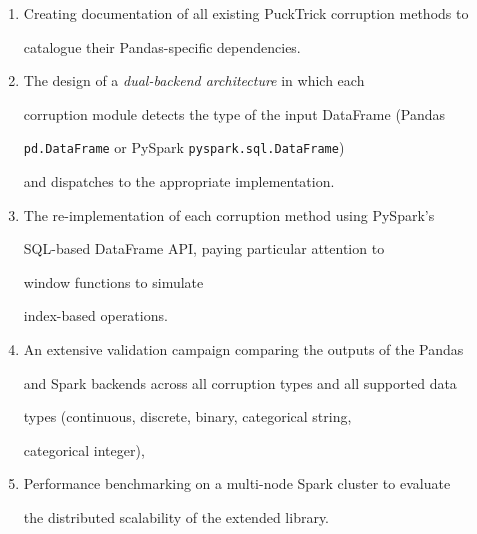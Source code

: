 \begin{enumerate}

    \item Creating documentation of all existing PuckTrick corruption methods to

          catalogue their Pandas-specific dependencies.

    \item The design of a \emph{dual-backend architecture} in which each

          corruption module detects the type of the input DataFrame (Pandas

          \texttt{pd.DataFrame} or PySpark \texttt{pyspark.sql.DataFrame})

          and dispatches to the appropriate implementation.

    \item The re-implementation of each corruption method using PySpark's

          SQL-based DataFrame API, paying particular attention to

          window functions to simulate

          index-based operations.

    \item An extensive validation campaign comparing the outputs of the Pandas

          and Spark backends across all corruption types and all supported data

          types (continuous, discrete, binary, categorical string,

          categorical integer),

    \item Performance benchmarking on a multi-node Spark cluster to evaluate

          the distributed scalability of the extended library.

\end{enumerate}

